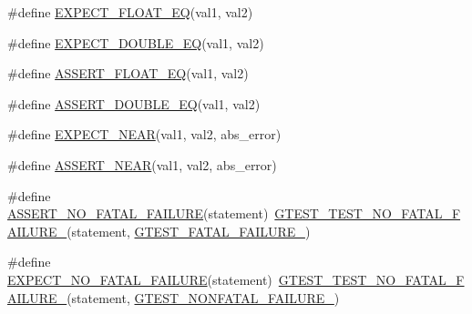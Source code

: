 \begin{DoxyCompactItemize}
\item 
\#define \mbox{\hyperlink{_obj__test_2lib_2googletest-master_2googletest_2include_2gtest_2gtest_8h_a981e552322fb084042d02d6dfa9860ca}{E\+X\+P\+E\+C\+T\+\_\+\+F\+L\+O\+A\+T\+\_\+\+EQ}}(val1,  val2)
\item 
\#define \mbox{\hyperlink{_obj__test_2lib_2googletest-master_2googletest_2include_2gtest_2gtest_8h_ab4852f9430cf656690256ea7fe6323b8}{E\+X\+P\+E\+C\+T\+\_\+\+D\+O\+U\+B\+L\+E\+\_\+\+EQ}}(val1,  val2)
\item 
\#define \mbox{\hyperlink{_obj__test_2lib_2googletest-master_2googletest_2include_2gtest_2gtest_8h_a4663ffbf844baa54bdb29f9148fd0f96}{A\+S\+S\+E\+R\+T\+\_\+\+F\+L\+O\+A\+T\+\_\+\+EQ}}(val1,  val2)
\item 
\#define \mbox{\hyperlink{_obj__test_2lib_2googletest-master_2googletest_2include_2gtest_2gtest_8h_a6617da62e5ae5490995a3bfca1f331a9}{A\+S\+S\+E\+R\+T\+\_\+\+D\+O\+U\+B\+L\+E\+\_\+\+EQ}}(val1,  val2)
\item 
\#define \mbox{\hyperlink{_obj__test_2lib_2googletest-master_2googletest_2include_2gtest_2gtest_8h_a88cd7978af0e7dbd42cd606dfabdcc6f}{E\+X\+P\+E\+C\+T\+\_\+\+N\+E\+AR}}(val1,  val2,  abs\+\_\+error)
\item 
\#define \mbox{\hyperlink{_obj__test_2lib_2googletest-master_2googletest_2include_2gtest_2gtest_8h_a73cce6b752d204f91a36bef2f8e663b3}{A\+S\+S\+E\+R\+T\+\_\+\+N\+E\+AR}}(val1,  val2,  abs\+\_\+error)
\item 
\#define \mbox{\hyperlink{_obj__test_2lib_2googletest-master_2googletest_2include_2gtest_2gtest_8h_a5034fda3490aad5a93942ac83f4cea49}{A\+S\+S\+E\+R\+T\+\_\+\+N\+O\+\_\+\+F\+A\+T\+A\+L\+\_\+\+F\+A\+I\+L\+U\+RE}}(statement)~\mbox{\hyperlink{_obj__test_2lib_2googletest-release-1_88_81_2googletest_2include_2gtest_2internal_2gtest-internal_8h_a1b37a3c446836d33040f3266a6236081}{G\+T\+E\+S\+T\+\_\+\+T\+E\+S\+T\+\_\+\+N\+O\+\_\+\+F\+A\+T\+A\+L\+\_\+\+F\+A\+I\+L\+U\+R\+E\+\_\+}}(statement, \mbox{\hyperlink{_obj__test_2lib_2googletest-release-1_88_81_2googletest_2include_2gtest_2internal_2gtest-internal_8h_a0f9a4c3ea82cc7bf4478eaffdc168358}{G\+T\+E\+S\+T\+\_\+\+F\+A\+T\+A\+L\+\_\+\+F\+A\+I\+L\+U\+R\+E\+\_\+}})
\item 
\#define \mbox{\hyperlink{_obj__test_2lib_2googletest-master_2googletest_2include_2gtest_2gtest_8h_a067c02ccaf3171d6e1781cd0f8cdcf74}{E\+X\+P\+E\+C\+T\+\_\+\+N\+O\+\_\+\+F\+A\+T\+A\+L\+\_\+\+F\+A\+I\+L\+U\+RE}}(statement)~\mbox{\hyperlink{_obj__test_2lib_2googletest-release-1_88_81_2googletest_2include_2gtest_2internal_2gtest-internal_8h_a1b37a3c446836d33040f3266a6236081}{G\+T\+E\+S\+T\+\_\+\+T\+E\+S\+T\+\_\+\+N\+O\+\_\+\+F\+A\+T\+A\+L\+\_\+\+F\+A\+I\+L\+U\+R\+E\+\_\+}}(statement, \mbox{\hyperlink{_obj__test_2lib_2googletest-release-1_88_81_2googletest_2include_2gtest_2internal_2gtest-internal_8h_a6cb7482cfa03661a91c698eb5895f642}{G\+T\+E\+S\+T\+\_\+\+N\+O\+N\+F\+A\+T\+A\+L\+\_\+\+F\+A\+I\+L\+U\+R\+E\+\_\+}})

\end{DoxyCompactItemize}
